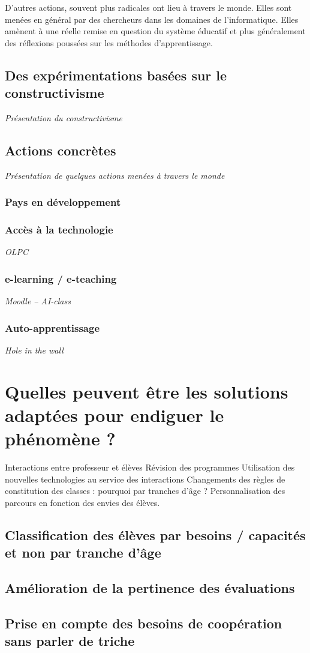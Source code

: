 D'autres actions, souvent plus radicales ont lieu à travers le monde. Elles sont menées en général par des chercheurs dans les domaines de l'informatique. Elles amènent à une réelle remise en question du système éducatif et plus généralement des réflexions poussées sur les méthodes d'apprentissage.

\subsection{Des expérimentations basées sur le constructivisme}
\textit{Présentation du constructivisme}

\subsection{Actions concrètes}
\textit{Présentation de quelques actions menées à travers le monde}
\subsubsection{Pays en développement}
\subsubsection{Accès à la technologie}
\textit{OLPC}
\subsubsection{e-learning / e-teaching}
\textit{Moodle -- AI-class}
\subsubsection{Auto-apprentissage}
\textit{Hole in the wall}

\section{Quelles peuvent être les solutions adaptées pour endiguer le phénomène ?}\label{solutions}

Interactions entre professeur et élèves
Révision des programmes
Utilisation des nouvelles technologies au service des interactions
Changements des règles de constitution des classes : pourquoi par tranches d'âge ?
Personnalisation des parcours en fonction des envies des élèves.

\subsection{Classification des élèves par besoins / capacités  et non par tranche d'âge}
\subsection{Amélioration de la pertinence des évaluations}
\subsection{Prise en compte des besoins de coopération sans parler de triche}

